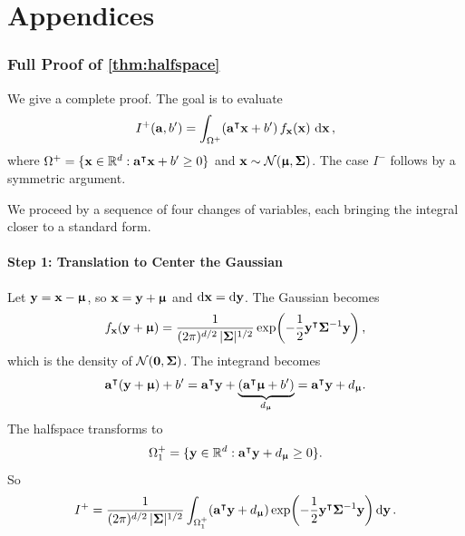 \documentclass[11pt, letterpaper]{article}
\newcommand{\bSigma}{\vb{\Sigma}}
\newcommand{\bmu}{\boldsymbol{\upmu}}
\newcommand{\R}{\mathbb{R}}
\newcommand{\Norm}{\mathcal{N}}
\begin{document}
\part*{Appendices}

\section{Full Proof of \cref{thm:halfspace}}\label{app:proof}

We give a complete proof. The goal is to evaluate
\begin{equation}
    I^+(\vb{a}, b') = \int_{\Omega^+}(\vb{a}^{\intercal}\vb{x} + b')\, f_{\vb{x}}(\vb{x})\,\dd{\vb{x}},
\end{equation}
where $\Omega^+ = \{\vb{x} \in \R^d : \vb{a}^{\intercal}\vb{x} + b' \geq 0\}$ and $\vb{x} \sim \Norm(\bmu, \bSigma)$. The case $I^-$ follows by a symmetric argument.

We proceed by a sequence of four changes of variables, each bringing the integral closer to a standard form.

\subsection{Step 1: Translation to Center the Gaussian}

Let $\vb{y} = \vb{x} - \bmu$, so $\vb{x} = \vb{y} + \bmu$ and $\dd{\vb{x}} = \dd{\vb{y}}$. The Gaussian becomes
\begin{equation}
    f_{\vb{x}}(\vb{y} + \bmu) = \frac{1}{(2\pi)^{d/2}\, |\bSigma|^{1/2}} \exp\!\left(-\frac{1}{2}\vb{y}^{\intercal}\bSigma^{-1}\vb{y}\right),
\end{equation}
which is the density of $\Norm(\vb{0}, \bSigma)$. The integrand becomes
\begin{equation}
    \vb{a}^{\intercal}(\vb{y} + \bmu) + b' = \vb{a}^{\intercal}\vb{y} + \underbrace{(\vb{a}^{\intercal}\bmu + b')}_{d_{\bmu}} = \vb{a}^{\intercal}\vb{y} + d_{\bmu}.
\end{equation}
The halfspace transforms to
\begin{equation}
    \Omega^+_1 = \{\vb{y} \in \R^d : \vb{a}^{\intercal}\vb{y} + d_{\bmu} \geq 0\}.
\end{equation}
So
\begin{equation}
    I^+ = \frac{1}{(2\pi)^{d/2}\, |\bSigma|^{1/2}} \int_{\Omega^+_1} (\vb{a}^{\intercal}\vb{y} + d_{\bmu}) \exp\!\left(-\frac{1}{2}\vb{y}^{\intercal}\bSigma^{-1}\vb{y}\right) \dd{\vb{y}}.
\end{equation}
\end{document}

